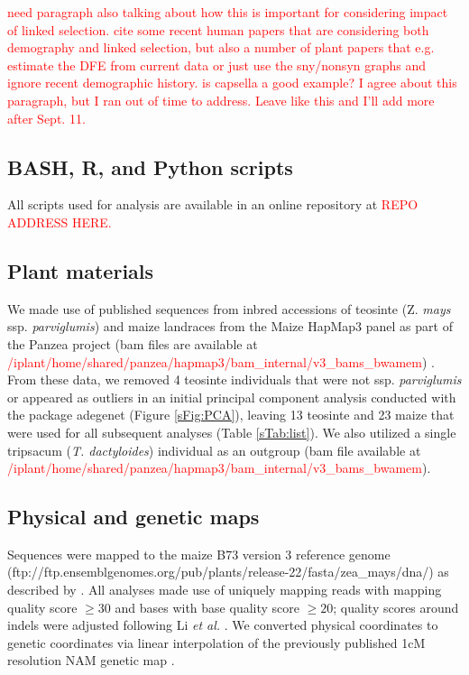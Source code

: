 \documentclass{pnastwo}
\newcommand{\jri}[1]{\textcolor{red}{\scriptsize #1}}
\begin{document}
\begin{article}
\jri{need paragraph also talking about how this is important for considering impact of linked selection. cite some recent human papers that are considering both demography and linked selection, but also a number of plant papers that e.g. estimate the DFE from current data or just use the sny/nonsyn graphs and ignore recent demographic history. is capsella a good example? } \textcolor{red}{I agree about this paragraph, but I ran out of time to address. Leave like this and I'll add more after Sept. 11.}

\begin{materials}

  \subsection{BASH, R, and Python scripts}
All scripts used for analysis are available in an online repository at \textcolor{red}{REPO ADDRESS HERE.} 

\subsection{Plant materials}
We made use of published sequences from inbred accessions of teosinte (Z. \emph{mays} ssp. \emph{parviglumis}) and maize landraces from the Maize HapMap3 panel as part of the Panzea project (bam files are available at \textcolor{red}{/iplant/home/shared/panzea/hapmap3/bam\_internal/v3\_bams\_bwamem}) \cite{chia2012, lemmon2014,hapmap3}. 
From these data, we removed 4 teosinte individuals that were not ssp. \emph{parviglumis} or appeared as outliers in an initial principal component analysis conducted with the package adegenet \cite{jombart2011} (Figure \ref{sFig:PCA}), leaving 13 teosinte and 23 maize that were used for all subsequent analyses (Table \ref{sTab:list}). We also utilized a single tripsacum (\emph{T. dactyloides}) individual as an outgroup (bam file available at \textcolor{red}{/iplant/home/shared/panzea/hapmap3/bam\_internal/v3\_bams\_bwamem}).

\subsection{Physical and genetic maps}
Sequences were mapped to the maize B73 version 3 reference genome \cite{schnable2009} (ftp://ftp.ensemblgenomes.org/pub/plants/release-22/fasta/zea\_mays/dna/) as described by \cite{hapmap3}. All analyses made use of uniquely mapping reads with mapping quality score $\geq  30$ and bases with base quality score $\geq 20$; quality scores around indels were adjusted following Li \emph{et al.} \cite{li2011statistical}.
We converted physical coordinates to genetic coordinates via linear interpolation of the previously published 1cM resolution NAM genetic map \cite{glaubitz2014}. 


\end{materials}
\end{article}
\end{document}
